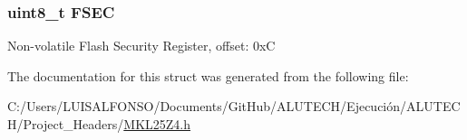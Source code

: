 \subsubsection[{F\+S\+E\+C}]{\setlength{\rightskip}{0pt plus 5cm}uint8\+\_\+t F\+S\+E\+C}\label{struct_n_v___mem_map_a4c7b35caf2d96b1c13a8cb7e15445dcb}
Non-\/volatile Flash Security Register, offset\+: 0x\+C 

The documentation for this struct was generated from the following file\+:\begin{DoxyCompactItemize}
\item 
C\+:/\+Users/\+L\+U\+I\+S\+A\+L\+F\+O\+N\+S\+O/\+Documents/\+Git\+Hub/\+A\+L\+U\+T\+E\+C\+H/\+Ejecución/\+A\+L\+U\+T\+E\+C\+H/\+Project\+\_\+\+Headers/\hyperlink{_m_k_l25_z4_8h}{M\+K\+L25\+Z4.\+h}\end{DoxyCompactItemize}
